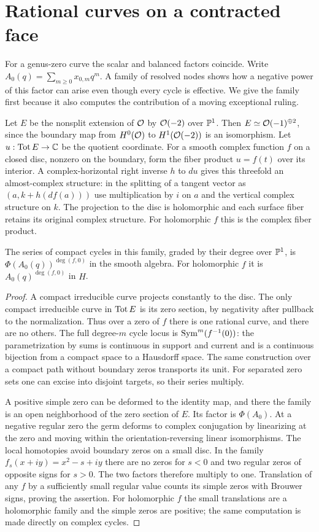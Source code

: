 \section{Rational curves on a contracted face}\label{sec:ruling}

For a genus-zero curve the scalar and balanced factors coincide. Write
$A_0(q)=\sum_{m\ge0}x_{0,m}q^m$. A family of resolved nodes shows how
a negative power of this factor can arise even though every cycle is
effective. We give the family first because it also computes the
contribution of a moving exceptional ruling.

Let $E$ be the nonsplit extension of $\mathcal O$ by $\mathcal O(-2)$ over $\mathbb P^1$.
Then $E\simeq\mathcal O(-1)^{\oplus2}$, since the boundary map from
$H^0(\mathcal O)$ to $H^1(\mathcal O(-2))$ is an isomorphism. Let
$u:\operatorname{Tot} E\to\mathbb C$ be the quotient coordinate. For a smooth complex
function $f$ on a closed disc, nonzero on the boundary, form the
fiber product $u=f(t)$ over its interior. A complex-horizontal
right inverse $h$ to $du$ gives this threefold an almost-complex
structure: in the splitting of a tangent vector as
$(a,k+h(df(a)))$ use multiplication by $i$ on $a$ and the vertical
complex structure on $k$. The projection to the disc is holomorphic
and each surface fiber retains its original complex structure.
For holomorphic $f$ this is the complex fiber product.

\begin{lemma}\label{lem:fold}
The series of compact cycles in this family, graded by their degree
over $\mathbb P^1$, is $\Phi(A_0(q))^{\deg(f,0)}$ in the smooth algebra.
For holomorphic $f$ it is $A_0(q)^{\deg(f,0)}$ in $H$.
\end{lemma}
\begin{proof}
A compact irreducible curve projects constantly to the disc. The only
compact irreducible curve in $\operatorname{Tot} E$ is its zero section, by negativity
after pullback to the normalization. Thus over a zero of $f$ there is
one rational curve, and there are no others. The full degree-$m$ cycle
locus is $\operatorname{Sym}^m(f^{-1}(0))$: the parametrization by sums is continuous
in support and current and is a continuous bijection from a compact
space to a Hausdorff space. The same construction over a compact path
without boundary zeros transports its unit. For separated zero sets
one can excise into disjoint targets, so their series multiply.

A positive simple zero can be deformed to the identity map, and there
the family is an open neighborhood of the zero section of $E$.
Its factor is $\Phi(A_0)$. At a negative regular zero the germ deforms
to complex conjugation by linearizing at the zero and moving within
the orientation-reversing linear isomorphisms. The local homotopies
avoid boundary zeros on a small disc. In the family
$f_s(x+iy)=x^2-s+iy$ there are no zeros for $s<0$ and two regular
zeros of opposite signs for $s>0$. The two factors therefore multiply
to one. Translation of any $f$ by a sufficiently small regular value
counts its simple zeros with Brouwer signs, proving the assertion.
For holomorphic $f$ the small translations are a holomorphic family
and the simple zeros are positive; the same computation is made
directly on complex cycles.
\end{proof}

